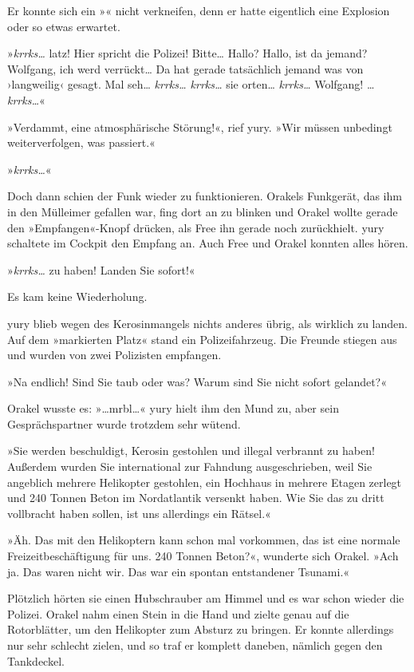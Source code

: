 Er konnte sich ein »« nicht verkneifen, denn er hatte eigentlich eine Explosion oder so etwas erwartet.

»\textit{krrks…} latz! Hier spricht die Polizei! Bitte… Hallo? Hallo, ist da jemand? Wolfgang, ich werd verrückt… Da hat gerade tatsächlich jemand was von ›langweilig‹ gesagt. Mal seh… \textit{krrks… krrks…} sie orten… \textit{krrks…} Wolfgang! … \textit{krrks…}«

»Verdammt, eine atmosphärische Störung!«, rief yury. »Wir müssen unbedingt weiterverfolgen, was passiert.«

»\textit{krrks…}«

Doch dann schien der Funk wieder zu funktionieren. Orakels Funkgerät, das ihm in den Mülleimer gefallen war, fing dort an zu blinken und Orakel wollte gerade den »Empfangen«-Knopf drücken, als Free ihn gerade noch zurückhielt. yury schaltete im Cockpit den Empfang an. Auch Free und Orakel konnten alles hören.

»\textit{krrks…} zu haben! Landen Sie sofort!«

Es kam keine Wiederholung.

yury blieb wegen des Kerosinmangels nichts anderes übrig, als wirklich zu landen. Auf dem »markierten Platz« stand ein Polizeifahrzeug. Die Freunde stiegen aus und wurden von zwei Polizisten empfangen.

»Na endlich! Sind Sie taub oder was? Warum sind Sie nicht sofort gelandet?«

Orakel wusste es: »…mrbl…« yury hielt ihm den Mund zu, aber sein Gesprächspartner wurde trotzdem sehr wütend.

»Sie werden beschuldigt, Kerosin gestohlen und illegal verbrannt zu haben! Außerdem wurden Sie international zur Fahndung ausgeschrieben, weil Sie angeblich mehrere Helikopter gestohlen, ein Hochhaus in mehrere Etagen zerlegt und 240 Tonnen Beton im Nordatlantik versenkt haben. Wie Sie das zu dritt vollbracht haben sollen, ist uns allerdings ein Rätsel.«

»Äh. Das mit den Helikoptern kann schon mal vorkommen, das ist eine normale Freizeitbeschäftigung für uns. 240 Tonnen Beton?«, wunderte sich Orakel. »Ach ja. Das waren nicht wir. Das war ein spontan entstandener Tsunami.«

Plötzlich hörten sie einen Hubschrauber am Himmel und es war schon wieder die Polizei. Orakel nahm einen Stein in die Hand und zielte genau auf die Rotorblätter, um den Helikopter zum Absturz zu bringen. Er konnte allerdings nur sehr schlecht zielen, und so traf er komplett daneben, nämlich gegen den Tankdeckel.

